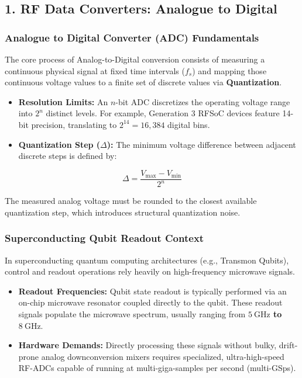 \documentclass[
]{article}
\providecommand{\tightlist}{%
  \setlength{\itemsep}{0pt}\setlength{\parskip}{0pt}}
\begin{document}
\subsection{1. RF Data Converters: Analogue to
Digital}\label{rf-data-converters-analogue-to-digital}

\subsubsection{Analogue to Digital Converter (ADC)
Fundamentals}\label{analogue-to-digital-converter-adc-fundamentals}

The core process of Analog-to-Digital conversion consists of measuring a
continuous physical signal at fixed time intervals (\(f_s\)) and mapping
those continuous voltage values to a finite set of discrete values via
\textbf{Quantization}.

\begin{itemize}
\tightlist
\item
  \textbf{Resolution Limits:} An \(n\)-bit ADC discretizes the operating
  voltage range into \(2^n\) distinct levels. For example, Generation 3
  RFSoC devices feature 14-bit precision, translating to
  \(2^{14} = 16,384\) digital bins.
\item
  \textbf{Quantization Step (\(\Delta\)):} The minimum voltage
  difference between adjacent discrete steps is defined by:
\end{itemize}

\[\Delta = \frac{V_{\max} - V_{\min}}{2^n}\]

The measured analog voltage must be rounded to the closest available
quantization step, which introduces structural quantization noise.

\subsubsection{Superconducting Qubit Readout
Context}\label{superconducting-qubit-readout-context}

In superconducting quantum computing architectures (e.g., Transmon
Qubits), control and readout operations rely heavily on high-frequency
microwave signals.

\begin{itemize}
\tightlist
\item
  \textbf{Readout Frequencies:} Qubit state readout is typically
  performed via an on-chip microwave resonator coupled directly to the
  qubit. These readout signals populate the microwave spectrum, usually
  ranging from \textbf{\(5\ \text{GHz}\) to \(8\ \text{GHz}\)}.
\item
  \textbf{Hardware Demands:} Directly processing these signals without
  bulky, drift-prone analog downconversion mixers requires specialized,
  ultra-high-speed RF-ADCs capable of running at multi-giga-samples per
  second (multi-GSps).
\end{itemize}
\end{document}
